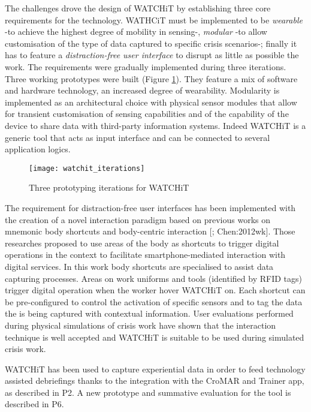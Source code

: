 The challenges drove the design of WATCHiT by establishing three core requirements for the technology. WATHCiT must be implemented to be \emph{wearable} -to achieve the highest degree of mobility in sensing-, \emph{modular} -to allow customisation of the type of data captured to specific crisis scenarios-; finally it has to feature a \emph{distraction-free user interface} to disrupt as little as possible the work. The requirements were gradually implemented during three iterations. Three working prototypes were built (Figure \ref{fig:watchit-prototypes}). They feature a mix of software and hardware technology, an increased degree of wearability. Modularity is implemented as an architectural choice with physical sensor modules that allow for transient customisation of sensing capabilities and of the capability of the device to share data with third-party information systems. Indeed WATCHiT is a generic tool that acts as input interface and can be connected to several application logics.
\begin{figure}
	[tbh] \centering 
	\texttt{[image: watchit\_iterations]} \caption{Three prototyping iterations for WATCHiT} \label{fig:watchit-prototypes} 
\end{figure}

The requirement for distraction-free user interfaces has been implemented with the creation of a novel interaction paradigm based on previous works on mnemonic body shortcuts and body-centric interaction {[}\textcite{Guerreiro:2008wt}; Chen:2012wk{]}. Those researches proposed to use areas of the body as shortcuts to trigger digital operations in the context to facilitate smartphone-mediated interaction with digital services. In this work body shortcuts are specialised to assist data capturing processes. Areas on work uniforms and tools (identified by RFID tags) trigger digital operation when the worker hover WATCHiT on. Each shortcut can be pre-configured to control the activation of specific sensors and to tag the data the is being captured with contextual information. User evaluations performed during physical simulations of crisis work have shown that the interaction technique is well accepted and WATCHiT is suitable to be used during simulated crisis work.

WATCHiT has been used to capture experiential data in order to feed technology assisted debriefings thanks to the integration with the CroMAR and Trainer app, as described in P2. A new prototype and summative evaluation for the tool is described in P6.

